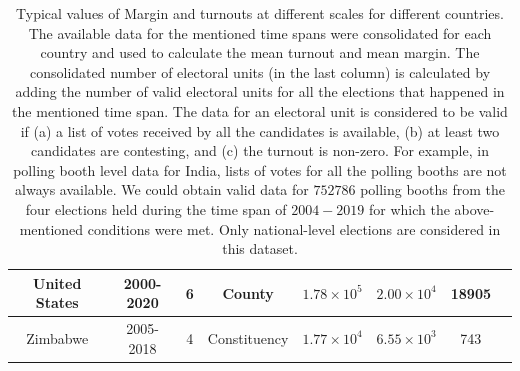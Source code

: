 \documentclass[reprint,aps,prl,showpacs,twocolumn, superscriptaddress]{revtex4-2}
\begin{document}
\begin{table}[h]
\begin{tabular}{|c|c|c|c|c|c|c|c|}
United States & 2000-2020 & 6 & County & $1.78\times 10^{5}$ & $2.00\times 10^{4}$ & 18905\\ \hline
Zimbabwe & 2005-2018 & 4 & Constituency & $1.77\times 10^{4}$ & $6.55\times 10^{3}$ & 743\\ \hline
\end{tabular}
\caption{Typical values of Margin and turnouts at different scales for different countries. The available data for the mentioned time spans were consolidated for each country and used to calculate the mean turnout and mean margin. The consolidated number of electoral units (in the last column) is calculated by adding the number of valid electoral units for all the elections that happened in the mentioned time span. The data for an electoral unit is considered to be valid if (a) a list of votes received by all the candidates is available, (b) at least two candidates are contesting, and (c) the turnout is non-zero. For example, in polling booth level data for India, lists of votes for all the polling booths are not always available. We could obtain valid data for $752786$ polling booths from the four elections held during the time span of $2004-2019$ for which the above-mentioned conditions were met. Only national-level elections are considered in this dataset.}
\label{table}
\end{table}

\newpage
\end{document}
